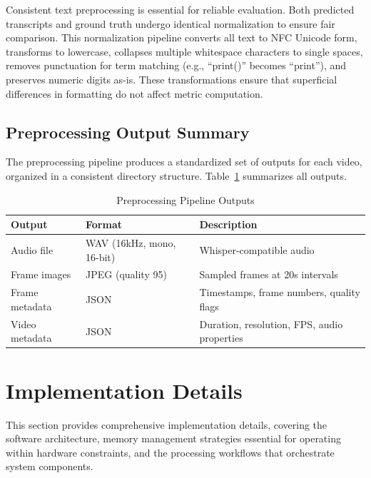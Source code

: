 Consistent text preprocessing is essential for reliable evaluation. Both predicted transcripts and ground truth undergo identical normalization to ensure fair comparison. This normalization pipeline converts all text to NFC Unicode form, transforms to lowercase, collapses multiple whitespace characters to single spaces, removes punctuation for term matching (e.g., ``print()'' becomes ``print''), and preserves numeric digits as-is. These transformations ensure that superficial differences in formatting do not affect metric computation.

\subsection{Preprocessing Output Summary}

The preprocessing pipeline produces a standardized set of outputs for each video, organized in a consistent directory structure. Table~\ref{tab:preprocessed_outputs} summarizes all outputs.

\begin{table}[h]
\centering
\caption{Preprocessing Pipeline Outputs}
\label{tab:preprocessed_outputs}
\begin{tabular}{|l|l|p{6cm}|}
\hline
\textbf{Output} & \textbf{Format} & \textbf{Description} \\
\hline
Audio file & WAV (16kHz, mono, 16-bit) & Whisper-compatible audio \\
\hline
Frame images & JPEG (quality 95) & Sampled frames at 20s intervals \\
\hline
Frame metadata & JSON & Timestamps, frame numbers, quality flags \\
\hline
Video metadata & JSON & Duration, resolution, FPS, audio properties \\
\hline
\end{tabular}
\end{table}

\section{Implementation Details}
\label{sec:implementation_details}

This section provides comprehensive implementation details, covering the software architecture, memory management strategies essential for operating within hardware constraints, and the processing workflows that orchestrate system components.

